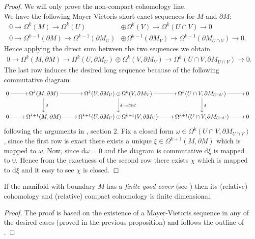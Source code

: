 \begin{proof} We will only prove the non-compact cohomology line.\\
	We have the following Mayer-Vietoris short exact sequences for $M$ and $\partial M$:
	\begin{align*}
	0\longrightarrow\Omega^k(M)\longrightarrow\Omega^k(U)&\oplus\Omega^k(V)\longrightarrow\Omega^k(U\cap V)\longrightarrow 0\\
	0\to  \Omega^{k-1}(\partial M)\to\Omega^{k-1}(\partial M_U)&\oplus\Omega^{k-1}(\partial M_V)\to\Omega^{k-1}(\partial M_{U\cap V})\to 0.
	\end{align*}
	Hence applying the direct sum between the two sequences we obtain
	\begin{align*}
	0\longrightarrow\Omega^k(M,\partial M)\longrightarrow\Omega^k(U,\partial M_U)\oplus\Omega^k(V,\partial M_V)\longrightarrow\Omega^k(U\cap V,\partial M_{U\cap V})\longrightarrow 0.
	\end{align*}
	The last row induces the desired long sequence because of the following commutative diagram
	\begin{equation}
	\xymatrix{
		0 \ar[r] &\Omega^k(M,\partial M) \ar[d]^d \ar[r] &\Omega^k(U,\partial M_U)\oplus\Omega^k(V,\partial M_V)\ar[d]^{\mathrm{d}:=d\oplus d} \ar[r] &\Omega^k(U\cap V,\partial M_{U\cap V}) \ar[d]^d \ar[r] &0 \\
		0 \ar[r] &\Omega^{k+1}(M,\partial M) \ar[r] &\Omega^{k+1}(U,\partial M_U)\oplus\Omega^{k+1}(V,\partial M_V)\ar[r] &\Omega^{k+1}(U\cap V,\partial M_{U\cap V}) \ar[r] &0}
	\end{equation}
	following the arguments in \cite{Bott-Tu-82}, section 2. Fix a closed form $\omega\in\Omega^k(U\cap V,\partial M_{U\cap V})$, since the first row is exact there exists a unique $\xi\in\Omega^{k+1}(M,\partial M)$ which is mapped to $\omega$. Now, since $\mathrm{d}\omega=0$ and the diagram is commutative $\mathrm{d}\xi$ is mapped to $0$. Hence from the exactness of the second row there exists $\chi$ which is mapped to $\mathrm{d}\xi$ and it easy to see $\chi$ is closed.
\end{proof}

\begin{lemma}
	If the manifold with boundary $M$ has a \emph{finite good cover} (see \cite[Sec. 5]{Bott-Tu-82}) then its (relative) cohomology and (relative) compact cohomology is finite dimensional.
\end{lemma}

\begin{proof}
	The proof is based on the existence of a Mayer-Vietoris sequence in any of the desired cases (proved in the previous proposition) and follows the outline of \cite[Prop. 5.3.1]{Bott-Tu-82}.
\end{proof}

